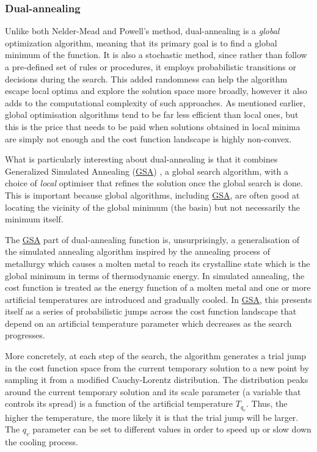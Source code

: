 \documentclass[a4paper,oneside,11pt]{book}
\newcommand{\acrref}[1]{\hyperref[acr:#1]{#1}}
\begin{document}
\subsubsection{Dual-annealing}\label{sec:3.1.3.3_dual_annealing}

Unlike both Nelder-Mead and Powell's method, dual-annealing is a \emph{global} optimization algorithm, meaning that its primary goal is to find a global minimum of the function. It is also a stochastic method, since rather than follow a pre-defined set of rules or procedures, it employs probabilistic transitions or decisions during the search. This added randomness can help the algorithm escape local optima and explore the solution space more broadly, however it also adds to the computational complexity of such approaches. As mentioned earlier, global optimisation algorithms tend to be far less efficient than local ones, but this is the price that needs to be paid when solutions obtained in local minima are simply not enough and the cost function landscape is highly non-convex. 

What is particularly interesting about dual-annealing is that it combines Generalized Simulated Annealing (\acrref{GSA}) \cite{tsallis_generalized_1996}, a global search algorithm, with a choice of \emph{local} optimiser that refines the solution once the global search is done. This is important because global algorithms, including \acrref{GSA}, are often good at locating the vicinity of the global minimum (the basin) but not necessarily the minimum itself. 

The \acrref{GSA} part of dual-annealing function is, unsurprisingly, a generalisation of the simulated annealing algorithm \cite{kirkpatrick_optimization_1983} inspired by the annealing process of metallurgy which causes a molten metal to reach its crystalline state which is the global minimum in terms of thermodynamic energy. In simulated annealing, the cost function is treated as the energy function of a molten metal and one or more artificial temperatures are introduced and gradually cooled. In \acrref{GSA}, this presents itself as a series of probabilistic jumps across the cost function landscape that depend on an artificial temperature parameter which decreases as the search progresses. 

More concretely, at each step of the search, the algorithm generates a trial jump in the cost function space from the current temporary solution to a new point by sampling it from a modified Cauchy-Lorentz distribution. The distribution peaks around the current temporary solution and its scale parameter (a variable that controls its spread) is a function of the artificial temperature $T_{q_v}$. Thus, the higher the temperature, the more likely it is that the trial jump will be larger. The $q_v$ parameter can be set to different values in order to speed up or slow down the cooling process.
\end{document}

